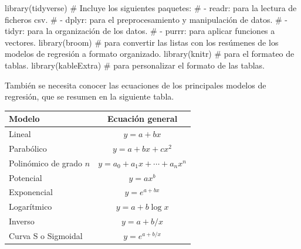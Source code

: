\documentclass[
  a4paper,
]{scrreport}
\newenvironment{Shaded}{\begin{snugshade}}{\end{snugshade}}
\newcommand{\CommentTok}[1]{\textcolor[rgb]{0.37,0.37,0.37}{#1}}
\newcommand{\FunctionTok}[1]{\textcolor[rgb]{0.28,0.35,0.67}{#1}}
\newcommand{\NormalTok}[1]{\textcolor[rgb]{0.00,0.23,0.31}{#1}}
\theoremstyle{definition}
\theoremstyle{remark}
\begin{document}
\begin{Shaded}
\begin{Highlighting}[]
\FunctionTok{library}\NormalTok{(tidyverse) }
\CommentTok{\# Incluye los siguientes paquetes:}
\CommentTok{\# {-} readr: para la lectura de ficheros csv. }
\CommentTok{\# {-} dplyr: para el preprocesamiento y manipulación de datos.}
\CommentTok{\# {-} tidyr: para la organización de los datos.}
\CommentTok{\# {-} purrr: para aplicar funciones a vectores. }
\FunctionTok{library}\NormalTok{(broom) }\CommentTok{\# para convertir las listas con los resúmenes de los modelos de regresión a formato organizado.}
\FunctionTok{library}\NormalTok{(knitr) }\CommentTok{\# para el formateo de tablas.}
\FunctionTok{library}\NormalTok{(kableExtra) }\CommentTok{\# para personalizar el formato de las tablas.}
\end{Highlighting}
\end{Shaded}

También se necesita conocer las ecuaciones de los principales modelos de
regresión, que se resumen en la siguiente tabla.

\begin{longtable}[]{@{}lc@{}}
\toprule\noalign{}
Modelo & Ecuación general \\
\midrule\noalign{}
\endhead
\bottomrule\noalign{}
\endlastfoot
Lineal & \(y=a+bx\) \\
Parabólico & \(y=a+bx+cx^2\) \\
Polinómico de grado \(n\) & \(y=a_0+a_1x+\cdots+a_nx^n\) \\
Potencial & \(y=ax^b\) \\
Exponencial & \(y=e^{a+bx}\) \\
Logarítmico & \(y=a+b\log x\) \\
Inverso & \(y=a+b/x\) \\
Curva S o Sigmoidal & \(y= e^{a+b/x}\) \\
\end{longtable}
\end{document}
